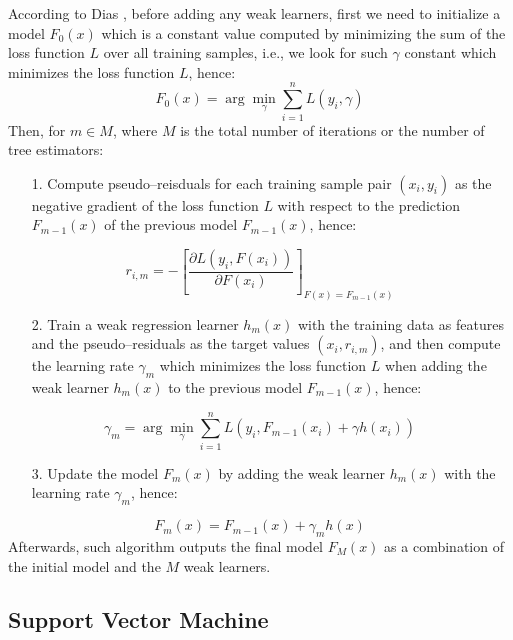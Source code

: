 According to Dias \citep{dias2018comparison}, before adding any weak learners, first we need to initialize a model $F_0(x)$ which is a constant value computed by minimizing the sum of the loss function $L$ over all training samples, i.e., we look for such $\gamma$ constant which minimizes the loss function $L$, hence:
\begin{equation}
    F_{0}(x) = \arg \min _{\gamma} \sum_{i=1}^{n} L\left(y_{i}, \gamma\right)
\end{equation}
Then, for $m \in M$, where $M$ is the total number of iterations or the number of tree estimators:
\begin{itemize}\setlength\itemsep{0em}
    \item[1.] Compute pseudo--reisduals for each training sample pair $(x_i, y_i)$ as the negative gradient of the loss function $L$ with respect to the prediction $F_{m-1}(x)$ of the previous model $F_{m-1}(x)$, hence:
\end{itemize}
\begin{equation}
    r_{i,m} = -\left[\frac{\partial L\left(y_{i}, F\left(x_{i}\right)\right)}{\partial F\left(x_{i}\right)}\right]_{F(x)=F_{m-1}(x)}
\end{equation}
\begin{itemize}\setlength\itemsep{0em}
    \item[2.] Train a weak regression learner $h_m(x)$ with the training data as features and the pseudo--residuals as the target values $(x_i, r_{i,m})$, and then compute the learning rate $\gamma_m$ which minimizes the loss function $L$ when adding the weak learner $h_m(x)$ to the previous model $F_{m-1}(x)$, hence:
\end{itemize}
\begin{equation}
    \gamma_{m} = \arg \min _{\gamma} \sum_{i=1}^{n} L\left(y_{i}, F_{m-1}\left(x_{i}\right)+\gamma h\left(x_{i}\right)\right)
\end{equation}
\begin{itemize}\setlength\itemsep{0em}
    \item[3.] Update the model $F_m(x)$ by adding the weak learner $h_m(x)$ with the learning rate $\gamma_m$, hence:
\end{itemize}
\begin{equation}
    F_m(x) = F_{m-1}(x) + \gamma_m h(x)
\end{equation}
Afterwards, such algorithm outputs the final model $F_M(x)$ as a combination of the initial model and the $M$ weak learners.

\subsection{Support Vector Machine}

